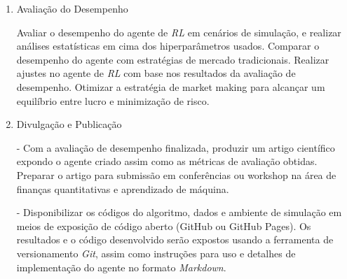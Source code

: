 \begin{enumerate}
\item Avaliação do Desempenho \label{item:evaluation}

Avaliar o desempenho do agente de \textit{RL} em cenários de simulação, e realizar análises estatísticas em cima dos hiperparâmetros usados. Comparar o desempenho do agente com estratégias de mercado tradicionais.
Realizar ajustes no agente de \textit{RL} com base nos resultados da avaliação de desempenho. Otimizar a estratégia de market making para alcançar um equilíbrio entre lucro e minimização de risco.

\item Divulgação e Publicação \label{item:publishing}

- Com a avaliação de desempenho finalizada, produzir um artigo científico expondo o agente criado assim como as métricas de avaliação obtidas. Preparar o artigo para submissão em conferências ou workshop na área de finanças quantitativas e aprendizado de máquina.

- Disponibilizar os códigos do algoritmo, dados e ambiente de simulação em meios de exposição de código aberto (GitHub ou GitHub Pages). Os resultados e o código desenvolvido serão expostos usando a ferramenta de versionamento \textit{Git}, assim como instruções para uso e detalhes de implementação do agente no formato \textit{Markdown}.
\end{enumerate}
